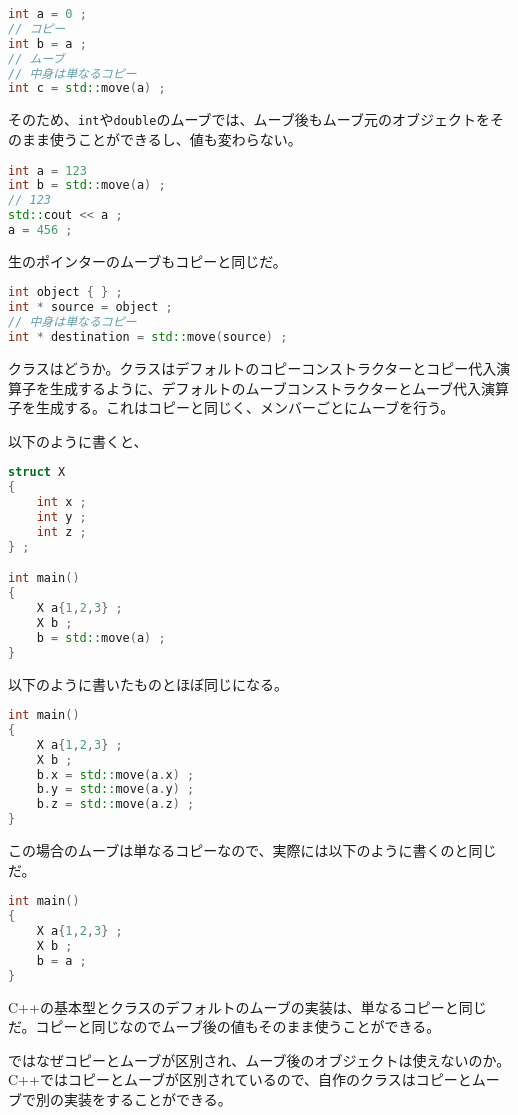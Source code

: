 \begin{lstlisting}[language={C++}]
int a = 0 ;
// コピー
int b = a ;
// ムーブ
// 中身は単なるコピー
int c = std::move(a) ;
\end{lstlisting}

そのため、\texttt{int}や\texttt{double}のムーブでは、ムーブ後もムーブ元のオブジェクトをそのまま使うことができるし、値も変わらない。

\begin{lstlisting}[language={C++}]
int a = 123 
int b = std::move(a) ;
// 123
std::cout << a ;
a = 456 ;
\end{lstlisting}

生のポインターのムーブもコピーと同じだ。

\ifTombow\pagebreak\fi
\begin{lstlisting}[language={C++}]
int object { } ;
int * source = object ;
// 中身は単なるコピー
int * destination = std::move(source) ;
\end{lstlisting}

クラスはどうか。クラスはデフォルトのコピーコンストラクターとコピー代入演算子を生成するように、デフォルトのムーブコンストラクターとムーブ代入演算子を生成する。これはコピーと同じく、メンバーごとにムーブを行う。

以下のように書くと、
\begin{lstlisting}[language={C++}]
struct X
{
    int x ;
    int y ;
    int z ;
} ;

int main()
{
    X a{1,2,3} ;
    X b ;
    b = std::move(a) ;
}
\end{lstlisting}
以下のように書いたものとほぼ同じになる。

\begin{lstlisting}[language={C++}]
int main()
{
    X a{1,2,3} ;
    X b ;
    b.x = std::move(a.x) ;
    b.y = std::move(a.y) ;
    b.z = std::move(a.z) ;
}
\end{lstlisting}

この場合のムーブは単なるコピーなので、実際には以下のように書くのと同じだ。

\begin{lstlisting}[language={C++}]
int main()
{
    X a{1,2,3} ;
    X b ;
    b = a ;
}
\end{lstlisting}

C++の基本型とクラスのデフォルトのムーブの実装は、単なるコピーと同じだ。コピーと同じなのでムーブ後の値もそのまま使うことができる。

ではなぜコピーとムーブが区別され、ムーブ後のオブジェクトは使えないのか。C++ではコピーとムーブが区別されているので、自作のクラスはコピーとムーブで別の実装をすることができる。


